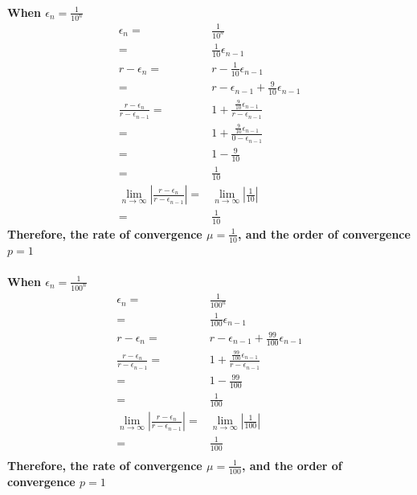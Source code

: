 \documentclass{article}
\begin{document}
            \paragraph{
            When $\epsilon_n=\frac{1}{10^n}$
                \begin{equation*}
                    \begin{split}
                        \epsilon_n=&\frac{1}{10^n}\\
                            =&\frac{1}{10}\epsilon_{n-1}\\
                        r-\epsilon_n=&r-\frac{1}{10}\epsilon_{n-1}\\
                            =&r-\epsilon_{n-1}+\frac{9}{10}\epsilon_{n-1}\\
                        \frac{r-\epsilon_n}{r-\epsilon_{n-1}}=&1+\frac{\frac{9}{10}\epsilon_{n-1}}{r-\epsilon_{n-1}}\\
                            =&1+\frac{\frac{9}{10}\epsilon_{n-1}}{0-\epsilon_{n-1}}\\
                            =&1-\frac{9}{10}\\
                            =&\frac{1}{10}\\
                        \lim_{n\rightarrow \infty} |\frac{r-\epsilon_n}{r-\epsilon_{n-1}}|=&\lim_{n\rightarrow \infty}| \frac{1}{10}|\\
                            =&\frac{1}{10}
                    \end{split}
                \end{equation*}
                Therefore, the rate of convergence $\mu=\frac{1}{10}$, and the order of convergence $p=1$
            }
                \paragraph{
            When $\epsilon_n=\frac{1}{100^n}$
            \begin{equation*}
                \begin{split}
                    \epsilon_n=&\frac{1}{100^n}\\
                        =&\frac{1}{100}\epsilon_{n-1}\\
                    r-\epsilon_n=&r-\epsilon_{n-1}+\frac{99}{100}\epsilon_{n-1}\\
                    \frac{r-\epsilon_n}{r-\epsilon_{n-1}}=&1+\frac{\frac{99}{100}\epsilon_{n-1}}{r-\epsilon_{n-1}}\\
                        =&1-\frac{99}{100}\\
                        =&\frac{1}{100}\\
                    \lim_{n\rightarrow \infty} |\frac{r-\epsilon_n}{r-\epsilon_{n-1}}|=&\lim_{n\rightarrow \infty}|\frac{1}{100}|\\
                        =&\frac{1}{100}\\
                \end{split}
            \end{equation*}
            Therefore, the rate of convergence $\mu=\frac{1}{100}$, and the order of convergence $p=1$
                }
\end{document}
